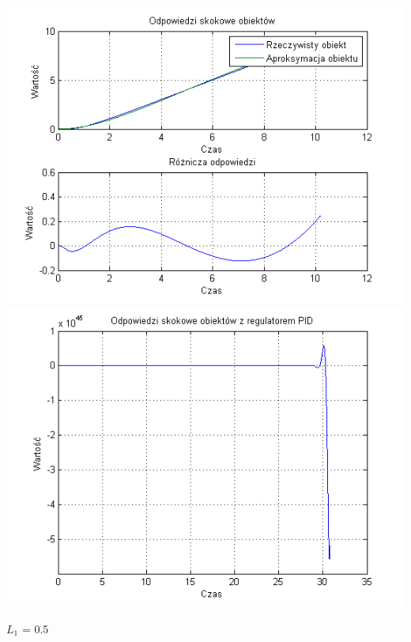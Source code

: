 \documentclass[10pt,a4paper]{article}
\begin{document}
\begin{center}
\includegraphics[scale=1]{images/dwa/skrypt_143.png}\\
\includegraphics[scale=1]{images/dwa/skrypt_144.png}\\
\end{center}
\newpage
$L_1$ = 0.5
\end{document}

